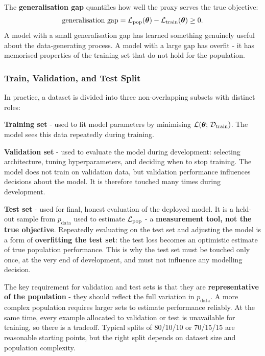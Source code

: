 The \textbf{generalisation gap} quantifies how well the proxy serves the true objective:
\begin{equation}
    \text{generalisation gap} = \mathcal{L}_{\text{pop}}(\boldsymbol{\theta}) - \mathcal{L}_{\text{train}}(\boldsymbol{\theta}) \geq 0.
\end{equation}
A model with a small generalisation gap has learned something genuinely useful about the data-generating process. A model with a large gap has overfit - it has memorised properties of the training set that do not hold for the population.

\subsubsection{Train, Validation, and Test Split}

In practice, a dataset is divided into three non-overlapping subsets with distinct roles:

\textbf{Training set} - used to fit model parameters by minimising $\mathcal{L}(\boldsymbol{\theta};\, \mathcal{D}_{\text{train}})$. The model sees this data repeatedly during training.

\textbf{Validation set} - used to evaluate the model during development: selecting architecture, tuning hyperparameters, and deciding when to stop training. The model does not train on validation data, but validation performance influences decisions about the model. It is therefore touched many times during development.

\textbf{Test set} - used for final, honest evaluation of the deployed model. It is a held-out sample from $p_{\text{data}}$ used to estimate $\mathcal{L}_{\text{pop}}$ - a \textbf{measurement tool, not the true objective}. Repeatedly evaluating on the test set and adjusting the model is a form of \textbf{overfitting the test set}: the test loss becomes an optimistic estimate of true population performance. This is why the test set must be touched only once, at the very end of development, and must not influence any modelling decision.

\begin{remark}
    The key requirement for validation and test sets is that they are \textbf{representative of the population} - they should reflect the full variation in $p_{\text{data}}$. A more complex population requires larger sets to estimate performance reliably. At the same time, every example allocated to validation or test is unavailable for training, so there is a tradeoff. Typical splits of 80/10/10 or 70/15/15 are reasonable starting points, but the right split depends on dataset size and population complexity.
\end{remark}


